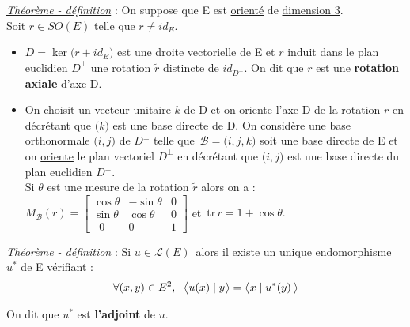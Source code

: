 \underline{\emph{Théorème - définition}} : On suppose que E est \underline{orienté} de \underline{dimension 3}.\vspace{0.1cm}\\
Soit \(r\in SO(E)\) telle que \(r\neq id_E.\)
\begin{itemize}[leftmargin=1cm, label=•]
    \item \(D= \ker \bigl(r+id_E \bigr)\) est une droite vectorielle de E et $r$ induit dans le plan euclidien \(D^\bot\) une rotation $\tilde{r}$ distincte de $id_{D^\bot}$. On dit que $r$ est une \textbf{rotation axiale} d'axe D.\vspace{0.2cm}
    
    \item On choisit un vecteur \underline{unitaire} $k$ de D et on \underline{oriente} l'axe D de la rotation $r$ en décrétant que $\bigl(k\bigr)$ est une base directe de D. On considère une base orthonormale $\bigl(i,j\bigr)$ de $D^\bot$ telle que \(\,\mathcal{B}=\bigl(i,j,k\bigr)\) soit une base directe de E et on \underline{oriente} le plan vectoriel $D^\bot$ en décrétant que $\bigl(i,j\bigr)$ est une base directe du plan euclidien $D^\bot$.\\
    Si $\theta$ est une mesure de la rotation $\tilde{r}$ alors on a : \(M_\mathcal{B}(r)=\left[
        \begin{array}{lrc}
            \cos \theta & -\sin \theta & 0 \\
            \sin \theta & \cos \theta & 0 \\
            \ \; 0 & 0 \ \; & 1
        \end{array}
    \right] \) et \(\, \text{tr}\,r=1+\cos \theta.\)
\end{itemize}

\vspace{1cm}

\underline{\emph{Théorème - définition}} : Si \(u \in \mathscr{L}(E)\,\) alors il existe un unique endomorphisme $u^*$ de E vérifiant :\vspace{-0.4cm} \[\forall(x,y)\in E^2,\ \; \bigl\langle u(x)\mid y \bigr\rangle=\bigl\langle x\mid u^*(y)\, \bigr\rangle\]

\vspace{-0.2cm}
On dit que $u^*$ est \textbf{l'adjoint} de $u$.

\vspace{2cm}